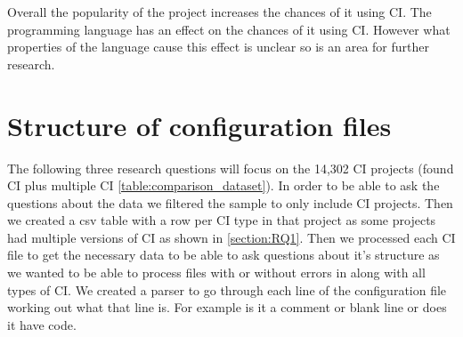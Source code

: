 \documentclass[10pt,conference]{IEEEtran}
\begin{document}
Overall the popularity of the project increases the chances of it using CI. The programming language has an effect on the chances of it using CI. However what properties of the language cause this effect is unclear so is an area for further research.


 
\pagebreak

\section{Structure of configuration files}

The following three research questions will focus on the 14,302 CI projects (found CI plus multiple CI \ref{table:comparison_dataset}). In order to be able to ask the questions about the data we filtered the sample to only include CI projects. Then we created a csv table with a row per CI type in that project as some projects had multiple versions of CI as shown in \ref{section:RQ1}. Then we processed each CI file to get the necessary data to be able to ask questions about it's structure as we wanted to be able to process files with or without errors in along with all types of CI. We created a parser to go through each line of the configuration file working out what that line is. For example is it a comment or blank line or does it have code. 


\vspace*{-0.05in}
\end{document}

